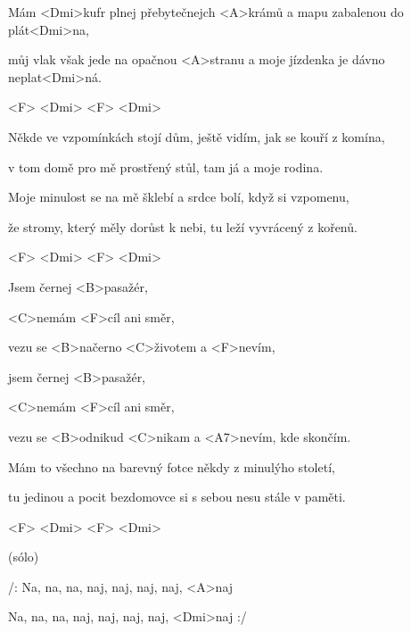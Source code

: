 

\zs
Mám <Dmi>kufr plnej přebytečnejch <A>krámů a mapu zabalenou do plát<Dmi>na, 

můj vlak však jede na opačnou <A>stranu a moje jízdenka je dávno neplat<Dmi>ná. 
\ks

<F> <Dmi> <F> <Dmi> 

\zs
Někde ve vzpomínkách stojí dům, ještě vidím, jak se kouří z komína,

v tom domě pro mě prostřený stůl, tam já a moje rodina.

Moje minulost se na mě šklebí a srdce bolí, když si vzpomenu,

že stromy, který měly dorůst k nebi, tu leží vyvrácený z kořenů.
\ks

<F> <Dmi> <F> <Dmi> 

\zr
Jsem černej <B>pasažér,

<C>nemám <F>cíl ani směr,

vezu se <B>načerno <C>životem a <F>nevím,

jsem černej <B>pasažér,

<C>nemám <F>cíl ani směr,

vezu se <B>odnikud <C>nikam a <A7>nevím, kde skončím.
\kr

\zs
Mám to všechno na barevný fotce někdy z minulýho století,

tu jedinou a pocit bezdomovce si s sebou nesu stále v paměti.
\ks

<F> <Dmi> <F> <Dmi> 

\zr \kr

\zr(sólo)\kr

\zs

/: Na, na, na, naj, naj, naj, naj, <A>naj
 
Na, na, na, naj, naj, naj, naj, <Dmi>naj :/
\ks

\kp
